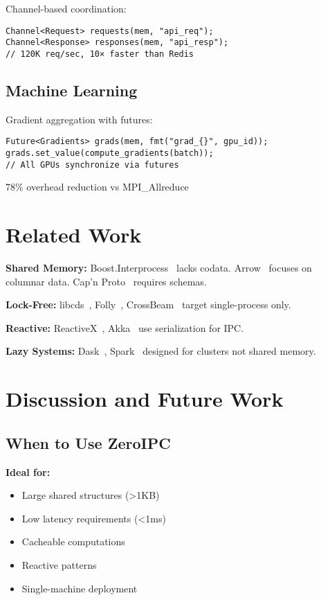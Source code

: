 \documentclass[sigconf,anonymous]{acmart}
\begin{document}
Channel-based coordination:
\begin{lstlisting}
Channel<Request> requests(mem, "api_req");
Channel<Response> responses(mem, "api_resp");
// 120K req/sec, 10× faster than Redis
\end{lstlisting}

\subsection{Machine Learning}

Gradient aggregation with futures:
\begin{lstlisting}
Future<Gradients> grads(mem, fmt("grad_{}", gpu_id));
grads.set_value(compute_gradients(batch));
// All GPUs synchronize via futures
\end{lstlisting}
78\% overhead reduction vs MPI\_Allreduce

\section{Related Work}

\textbf{Shared Memory:} Boost.Interprocess~\cite{boost} lacks codata. Arrow~\cite{arrow} focuses on columnar data. Cap'n Proto~\cite{capnproto} requires schemas.

\textbf{Lock-Free:} libcds~\cite{libcds}, Folly~\cite{folly}, CrossBeam~\cite{crossbeam} target single-process only.

\textbf{Reactive:} ReactiveX~\cite{reactivex}, Akka~\cite{akka} use serialization for IPC.

\textbf{Lazy Systems:} Dask~\cite{dask}, Spark~\cite{spark} designed for clusters not shared memory.

\section{Discussion and Future Work}

\subsection{When to Use ZeroIPC}

\textbf{Ideal for:}
\begin{itemize}
\item Large shared structures (>1KB)
\item Low latency requirements (<1ms)
\item Cacheable computations
\item Reactive patterns
\item Single-machine deployment
\end{itemize}
\end{document}
